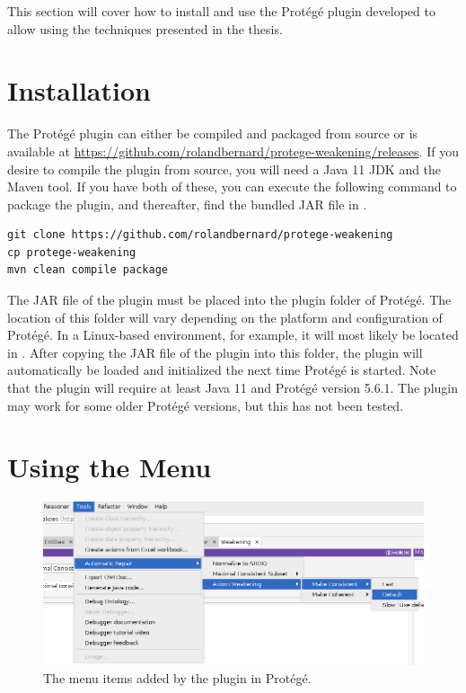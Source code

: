 
This section will cover how to install and use the Protégé plugin developed to allow using the techniques presented in the thesis.

\section{Installation}

The Protégé plugin can either be compiled and packaged from source or is available at \url{https://github.com/rolandbernard/protege-weakening/releases}. If you desire to compile the plugin from source, you will need a Java 11 JDK and the Maven tool. If you have both of these, you can execute the following command to package the plugin, and thereafter, find the bundled JAR file in .

\begin{lstlisting}
git clone https://github.com/rolandbernard/protege-weakening
cp protege-weakening
mvn clean compile package
\end{lstlisting}

The JAR file of the plugin must be placed into the plugin folder of Protégé. The location of this folder will vary depending on the platform and configuration of Protégé. In a Linux-based environment, for example, it will most likely be located in . After copying the JAR file of the plugin into this folder, the plugin will automatically be loaded and initialized the next time Protégé is started. Note that the plugin will require at least Java 11 and Protégé version 5.6.1. The plugin may work for some older Protégé versions, but this has not been tested.

\section{Using the Menu}

\begin{figure}[htbp]
  \centering
  \includegraphics[width=\textwidth]{resources/protege-guide-menu.png}
  \caption{The menu items added by the plugin in Protégé.}
\end{figure}

